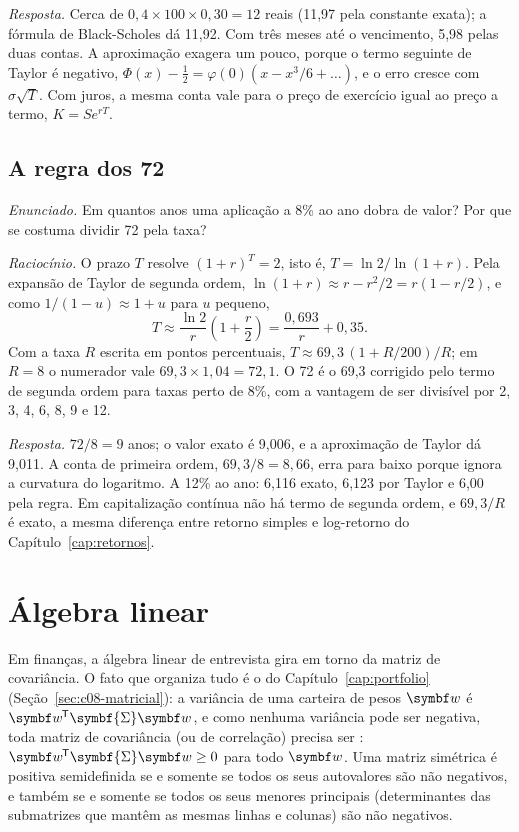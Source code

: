 \emph{Resposta.} Cerca de $0,4 \times 100 \times 0,30 = 12$ reais (11,97 pela constante exata); a fórmula de Black-Scholes dá 11,92. Com três meses até o vencimento, 5,98 pelas duas contas. A aproximação exagera um pouco, porque o termo seguinte de Taylor é negativo, $\Phi(x) - \frac12 = \varphi(0)(x - x^3/6 + \dots)$, e o erro cresce com $\sigma\sqrt{T}$. Com juros, a mesma conta vale para o preço de exercício igual ao preço a termo, $K = S e^{rT}$.

\subsection{A regra dos 72}

\emph{Enunciado.} Em quantos anos uma aplicação a 8\% ao ano dobra de valor? Por que se costuma dividir 72 pela taxa?

\emph{Raciocínio.} O prazo $T$ resolve $(1+r)^T = 2$, isto é, $T = \ln 2 / \ln(1+r)$. Pela expansão de Taylor de segunda ordem, $\ln(1+r) \approx r - r^2/2 = r(1 - r/2)$, e como $1/(1-u) \approx 1 + u$ para $u$ pequeno,
\begin{equation*}
  T \approx \frac{\ln 2}{r}\left(1 + \frac{r}{2}\right) = \frac{0,693}{r} + 0,35 .
\end{equation*}
Com a taxa $R$ escrita em pontos percentuais, $T \approx 69,3\,(1 + R/200)/R$; em $R = 8$ o numerador vale $69,3 \times 1,04 = 72,1$. O 72 é o 69,3 corrigido pelo termo de segunda ordem para taxas perto de 8\%, com a vantagem de ser divisível por 2, 3, 4, 6, 8, 9 e 12.

\emph{Resposta.} $72/8 = 9$ anos; o valor exato é 9,006, e a aproximação de Taylor dá 9,011. A conta de primeira ordem, $69,3/8 = 8,66$, erra para baixo porque ignora a curvatura do logaritmo. A 12\% ao ano: 6,116 exato, 6,123 por Taylor e 6,00 pela regra. Em capitalização contínua não há termo de segunda ordem, e $69,3/R$ é exato, a mesma diferença entre retorno simples e log-retorno do Capítulo~\ref{cap:retornos}.

\section{Álgebra linear}
\label{sec:c16-algebra}

Em finanças, a álgebra linear de entrevista gira em torno da matriz de covariância. O fato que organiza tudo é o do Capítulo~\ref{cap:portfolio} (Seção~\ref{sec:c08-matricial}): a variância de uma carteira de pesos $\vetor{w}$ é $\vetor{w}\T\symbf{\Sigma}\vetor{w}$, e como nenhuma variância pode ser negativa, toda matriz de covariância (ou de correlação) precisa ser : $\vetor{w}\T\symbf{\Sigma}\vetor{w} \ge 0$ para todo $\vetor{w}$. Uma matriz simétrica é positiva semidefinida se e somente se todos os seus autovalores são não negativos, e também se e somente se todos os seus menores principais (determinantes das submatrizes que mantêm as mesmas linhas e colunas) são não negativos.

